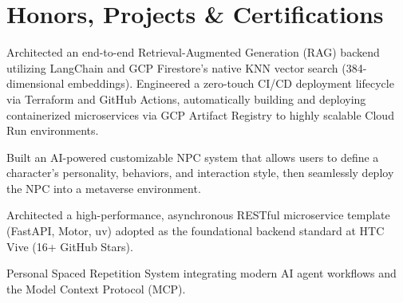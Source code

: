 \section{Honors, Projects \& Certifications}
\begin{resumeitems}
  \item Architected an end-to-end Retrieval-Augmented Generation (RAG) backend utilizing LangChain and GCP Firestore’s native KNN vector search (384-dimensional embeddings). Engineered a zero-touch CI/CD deployment lifecycle via Terraform and GitHub Actions, automatically building and deploying containerized microservices via GCP Artifact Registry to highly scalable Cloud Run environments.
\end{resumeitems}
\begin{resumeitems}
  \item Built an AI-powered customizable NPC system that allows users to define a character's personality, behaviors, and interaction style, then seamlessly deploy the NPC into a metaverse environment.
\end{resumeitems}
\begin{resumeitems}
  \item Architected a high-performance, asynchronous RESTful microservice template (FastAPI, Motor, uv) adopted as the foundational backend standard at HTC Vive (16+ GitHub Stars).
\end{resumeitems}
\begin{resumeitems}
  \item Personal Spaced Repetition System integrating modern AI agent workflows and the Model Context Protocol (MCP).
\end{resumeitems}
